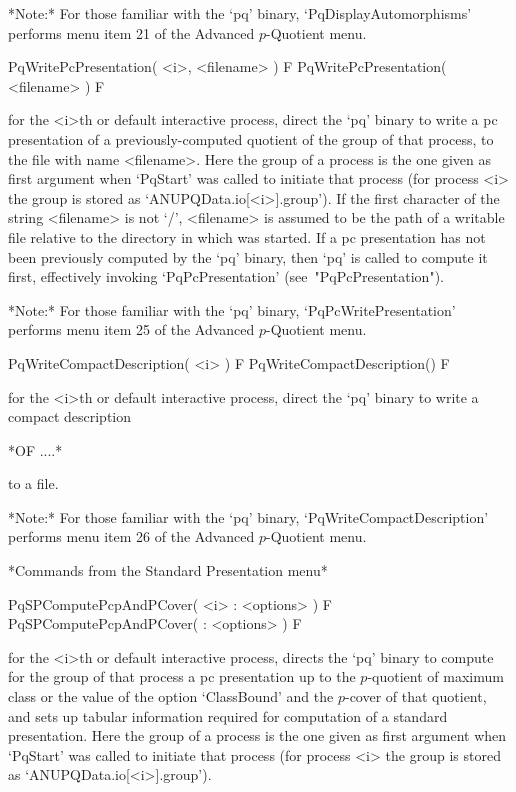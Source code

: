*Note:*
For  those  familiar  with  the  `pq'  binary,   `PqDisplayAutomorphisms'
performs menu item 21 of the Advanced $p$-Quotient menu.

\>PqWritePcPresentation( <i>, <filename> ) F
\>PqWritePcPresentation( <filename> ) F

for the <i>th or default interactive {\ANUPQ} process,  direct  the  `pq'
binary to write a pc presentation of a  previously-computed  quotient  of
the group of that process, to the file with  name  <filename>.  Here  the
group of a process is the one given as first argument when `PqStart'  was
called to initiate that process (for process <i> the group is  stored  as
`ANUPQData.io[<i>].group').  If  the  first  character  of   the   string
<filename> is not `/', <filename> is assumed to be the path of a writable
file relative to the directory in which  {\GAP}  was  started.  If  a  pc
presentation has not been previously computed by the  `pq'  binary,  then
`pq'   is   called   to   compute   it   first,   effectively    invoking
`PqPcPresentation' (see~"PqPcPresentation").

*Note:* For those familiar with the `pq' binary,  `PqPcWritePresentation'
performs menu item 25 of the Advanced $p$-Quotient menu.

\>PqWriteCompactDescription( <i> ) F
\>PqWriteCompactDescription() F

for the <i>th or default interactive {\ANUPQ} process,  direct  the  `pq'
binary to write a compact description 

*OF ....*

to a file.

*Note:* 
For those familiar  with  the  `pq'  binary,  `PqWriteCompactDescription'
performs menu item 26 of the Advanced $p$-Quotient menu.

*Commands from the Standard Presentation menu*

\>PqSPComputePcpAndPCover( <i> : <options> ) F
\>PqSPComputePcpAndPCover( : <options> ) F

for the <i>th or default interactive {\ANUPQ} process, directs  the  `pq'
binary to compute for the group of that process a pc presentation  up  to
the $p$-quotient of maximum class or the value of the option `ClassBound'
and the $p$-cover of that  quotient,  and  sets  up  tabular  information
required for computation of a standard presentation. Here the group of  a
process is the one given as first argument when `PqStart' was  called  to
initiate  that  process  (for  process  <i>  the  group  is   stored   as
`ANUPQData.io[<i>].group').

